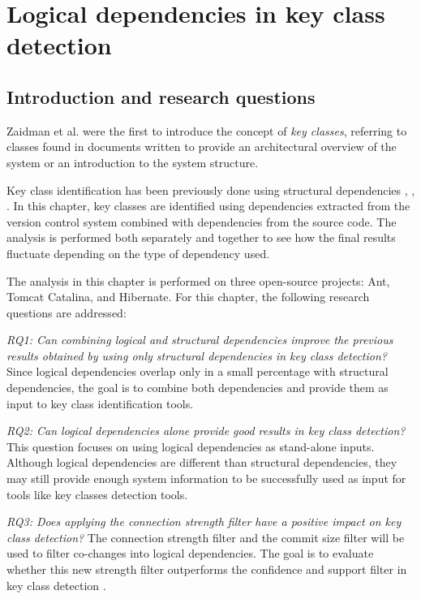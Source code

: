 \chapter{Logical dependencies in key class detection}
\label{cap:key_class_detection}

\section{Introduction and research questions}
\label{sec:key_introduction}
\hspace{4em}Zaidman et al. \cite{ZaidmanJurnal} were the first to introduce the concept of \emph{key classes}, referring to classes found in documents written to provide an architectural overview of the system or an introduction to the system structure.

Key class identification has been previously done using structural dependencies \cite{PagerankENASE}, \cite{enase15}, \cite{PagerankSACI}. In this chapter, key classes are identified using dependencies extracted from the version control system combined with dependencies from the source code. The analysis is performed both separately and together to see how the final results fluctuate depending on the type of dependency used.

The analysis in this chapter is performed on three open-source projects: Ant, Tomcat Catalina, and Hibernate. For this chapter, the following research questions are addressed:

\emph{RQ1: Can combining logical and structural dependencies improve the previous results obtained by using only structural dependencies in key class detection?}  
Since logical dependencies overlap only in a small percentage with structural dependencies, the goal is to combine both dependencies and provide them as input to key class identification tools.

\emph{RQ2: Can logical dependencies alone provide good results in key class detection?}  
This question focuses on using logical dependencies as stand-alone inputs. Although logical dependencies are different than structural dependencies, they may still provide enough system information to be successfully used as input for tools like key classes detection tools.

\emph{RQ3: Does applying the connection strength filter have a positive impact on key class detection?}  
The connection strength filter and the commit size filter will be used to filter co-changes into logical dependencies. The goal is to evaluate whether this new strength filter outperforms the confidence and support filter in key class detection \cite{b4}.






